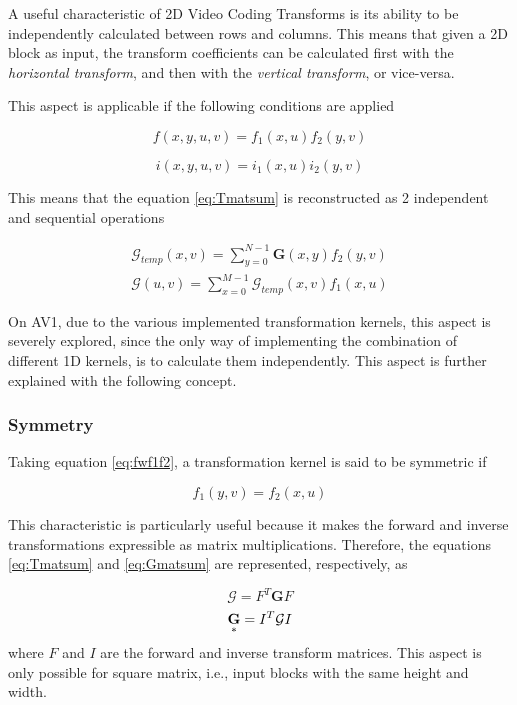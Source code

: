 A useful characteristic of 2D Video Coding Transforms is its ability to be independently calculated between rows and columns. This means that given a 2D block as input, the transform coefficients can be calculated first with the \emph{horizontal transform}, and then with the \emph{vertical transform}, or vice-versa.

This aspect is applicable if the following conditions are applied

\begin{equation} \label{eq:fwf1f2}
    f(x,y,u,v)=f_1(x,u)f_2(y,v)
\end{equation}


\begin{equation} \label{eq:ini1i2}
    i(x,y,u,v)=i_1(x,u)i_2(y,v)
\end{equation}

This means that the equation \ref{eq:Tmatsum} is reconstructed as 2 independent and sequential operations

\begin{gather}
    \mathcal{G}_{temp}(x,v) = \sum_{y=0}^{N-1}\mathbf{G}(x,y)f_2(y,v) \\
    \mathcal{G}(u,v) = \sum_{x=0}^{M-1}\mathcal{G}_{temp}(x,v)f_1(x,u)
\end{gather}

On AV1, due to the various implemented transformation kernels, this aspect is severely explored, since the only way of implementing the combination of different 1D kernels, is to calculate them independently. This aspect is further explained with the following concept.

\subsubsection{Symmetry}

Taking equation \ref{eq:fwf1f2}, a transformation kernel is said to be symmetric if 

\begin{equation}
    f_1(y,v) = f_2(x,u)
\end{equation}

This characteristic is particularly useful because it makes the forward and inverse transformations expressible as matrix multiplications. Therefore, the equations \ref{eq:Tmatsum} and \ref{eq:Gmatsum} are represented, respectively, as

\begin{equation}
    \mathcal{G} = F^T\mathbf{G}F 
\end{equation}
\begin{equation}
    \underset{*}{\mathbf{G}} = I^T\mathcal{G}I
\end{equation}
where $F$ and $I$ are the forward and inverse transform matrices. This aspect is only possible for square matrix, i.e., input blocks with the same height and width.

